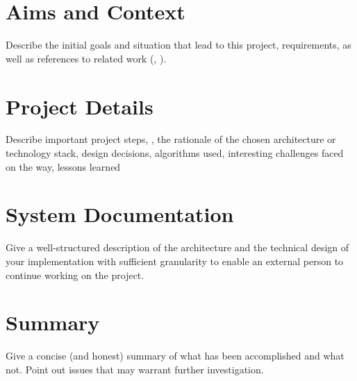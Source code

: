 \documentclass[english,notitlepage,smartquotes]{hgbreport}
\begin{document}
\tableofcontents

\chapter{Aims and Context}

Describe the initial goals and situation that lead to this project,
requirements, as well as references to related work (\eg, \cite{Higham2020}).

\chapter{Project Details}

Describe important project steps, \eg, the rationale of the chosen architecture
or technology stack, design decisions, algorithms used, interesting challenges
faced on the way, lessons learned \etc

\chapter{System Documentation}

Give a well-structured description of the architecture and the technical design
of your implementation with sufficient granularity to enable an external person
to continue working on the project.

\chapter{Summary}

Give a concise (and honest) summary of what has been accomplished and what not. 
Point out issues that may warrant further investigation.
\end{document}
